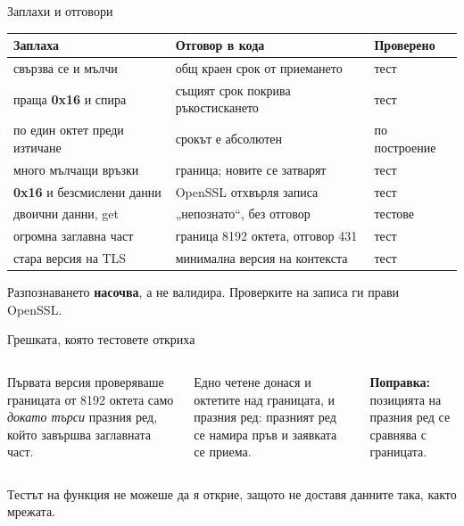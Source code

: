 \documentclass[aspectratio=169, 11pt]{beamer}
\newcommand{\code}[1]{{\ttfamily #1}}
\newcommand{\hex}[1]{{\ttfamily\bfseries #1}}
\begin{document}
\begin{frame}{Заплахи и отговори}
\small
\renewcommand{\arraystretch}{1.2}
\begin{tabular}{@{}p{}p{}p{}@{}}
\toprule
\textbf{Заплаха} & \textbf{Отговор в кода} & \textbf{Проверено} \\
\midrule
свързва се и мълчи & общ краен срок от приемането & тест \\
праща \hex{0x16} и спира & същият срок покрива ръкостискането & тест \\
по един октет преди изтичане & срокът е абсолютен & по построение \\
много мълчащи връзки & граница; новите се затварят & тест \\
\hex{0x16} и безсмислени данни & OpenSSL отхвърля записа & тест \\
двоични данни, \code{get} & „непознато“, без отговор & тестове \\
огромна заглавна част & граница 8192 октета, отговор 431 & тест \\
стара версия на TLS & минимална версия на контекста & тест \\
\bottomrule
\end{tabular}\par\medskip
Разпознаването \textbf{насочва}, а не валидира. Проверките на записа ги прави OpenSSL.
\end{frame}

\begin{frame}{Грешката, която тестовете откриха}
\begin{columns}[T]
Първата версия проверяваше границата от 8192 октета само \emph{докато търси} празния ред,
който завършва заглавната част.\par\medskip
Едно четене донася и октетите над границата, и празния ред: празният ред се намира
пръв и заявката се приема.\par\medskip
\textbf{Поправка:} позицията на празния ред се сравнява с границата.
\end{columns}
\vspace{0.8em}
{\small Тестът на функция не можеше да я открие, защото не доставя данните така, както мрежата.\par}
\end{frame}
\end{document}
